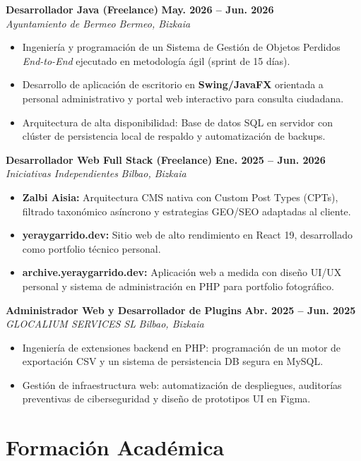 \documentclass[a4paper,10pt]{article}
\newcommand{\jobheader}[4]{
    \noindent\textbf{#1} \hfill \textbf{#2} \\
    \textit{#3} \hfill \textit{#4} \vspace{3pt}
}
\begin{document}
\jobheader{Desarrollador Java (Freelance)}{May. 2026 -- Jun. 2026}{Ayuntamiento de Bermeo}{Bermeo, Bizkaia}
\begin{itemize}[leftmargin=12pt, itemsep=3pt, topsep=4pt]
    \item Ingeniería y programación de un Sistema de Gestión de Objetos Perdidos \textit{End-to-End} ejecutado en metodología ágil (sprint de 15 días).
    \item Desarrollo de aplicación de escritorio en \textbf{Swing/JavaFX} orientada a personal administrativo y portal web interactivo para consulta ciudadana.
    \item Arquitectura de alta disponibilidad: Base de datos SQL en servidor con clúster de persistencia local de respaldo y automatización de backups.
\end{itemize}

\jobheader{Desarrollador Web Full Stack (Freelance)}{Ene. 2025 -- Jun. 2026}{Iniciativas Independientes}{Bilbao, Bizkaia}
\begin{itemize}[leftmargin=12pt, itemsep=3pt, topsep=4pt]
    \item \textbf{Zalbi Aisia:} Arquitectura CMS nativa con Custom Post Types (CPTs), filtrado taxonómico asíncrono y estrategias GEO/SEO adaptadas al cliente.
    \item \textbf{yeraygarrido.dev:} Sitio web de alto rendimiento en React 19, desarrollado como portfolio técnico personal.
    \item \textbf{archive.yeraygarrido.dev:} Aplicación web a medida con diseño UI/UX personal y sistema de administración en PHP para portfolio fotográfico.
\end{itemize}

\jobheader{Administrador Web y Desarrollador de Plugins}{Abr. 2025 -- Jun. 2025}{GLOCALIUM SERVICES SL}{Bilbao, Bizkaia}
\begin{itemize}[leftmargin=12pt, itemsep=3pt, topsep=4pt]
    \item Ingeniería de extensiones backend en PHP: programación de un motor de exportación CSV y un sistema de persistencia DB segura en MySQL.
    \item Gestión de infraestructura web: automatización de despliegues, auditorías preventivas de ciberseguridad y diseño de prototipos UI en Figma.
\end{itemize}

\section{Formación Académica}
\end{document}
